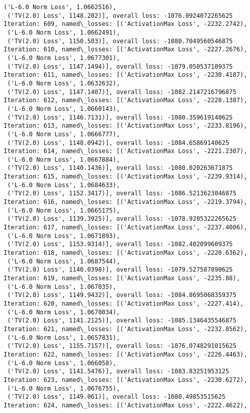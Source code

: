 \documentclass[10pt]{article}
\begin{document}
\begin{Verbatim}[commandchars=\\\{\}]
 ('L-6.0 Norm Loss', 1.0662516),
 ('TV(2.0) Loss', 1148.202)], overall loss: -1076.0924072265625
Iteration: 609, named\_losses: [('ActivationMax Loss', -2232.2742),
 ('L-6.0 Norm Loss', 1.0662491),
 ('TV(2.0) Loss', 1150.503)], overall loss: -1080.7049560546875
Iteration: 610, named\_losses: [('ActivationMax Loss', -2227.2676),
 ('L-6.0 Norm Loss', 1.0677301),
 ('TV(2.0) Loss', 1147.1494)], overall loss: -1079.050537109375
Iteration: 611, named\_losses: [('ActivationMax Loss', -2230.4187),
 ('L-6.0 Norm Loss', 1.0632632),
 ('TV(2.0) Loss', 1147.1407)], overall loss: -1082.2147216796875
Iteration: 612, named\_losses: [('ActivationMax Loss', -2228.1387),
 ('L-6.0 Norm Loss', 1.0660143),
 ('TV(2.0) Loss', 1146.7131)], overall loss: -1080.359619140625
Iteration: 613, named\_losses: [('ActivationMax Loss', -2233.8196),
 ('L-6.0 Norm Loss', 1.0666777),
 ('TV(2.0) Loss', 1148.0942)], overall loss: -1084.65869140625
Iteration: 614, named\_losses: [('ActivationMax Loss', -2221.2307),
 ('L-6.0 Norm Loss', 1.0667884),
 ('TV(2.0) Loss', 1140.1436)], overall loss: -1080.020263671875
Iteration: 615, named\_losses: [('ActivationMax Loss', -2239.9314),
 ('L-6.0 Norm Loss', 1.0684633),
 ('TV(2.0) Loss', 1152.3417)], overall loss: -1086.5213623046875
Iteration: 616, named\_losses: [('ActivationMax Loss', -2219.3794),
 ('L-6.0 Norm Loss', 1.0665175),
 ('TV(2.0) Loss', 1139.3925)], overall loss: -1078.9205322265625
Iteration: 617, named\_losses: [('ActivationMax Loss', -2237.4006),
 ('L-6.0 Norm Loss', 1.0671893),
 ('TV(2.0) Loss', 1153.9314)], overall loss: -1082.402099609375
Iteration: 618, named\_losses: [('ActivationMax Loss', -2220.6362),
 ('L-6.0 Norm Loss', 1.0687544),
 ('TV(2.0) Loss', 1140.0398)], overall loss: -1079.527587890625
Iteration: 619, named\_losses: [('ActivationMax Loss', -2235.88),
 ('L-6.0 Norm Loss', 1.067035),
 ('TV(2.0) Loss', 1149.9432)], overall loss: -1084.8695068359375
Iteration: 620, named\_losses: [('ActivationMax Loss', -2227.414),
 ('L-6.0 Norm Loss', 1.0670034),
 ('TV(2.0) Loss', 1141.2125)], overall loss: -1085.1346435546875
Iteration: 621, named\_losses: [('ActivationMax Loss', -2232.8562),
 ('L-6.0 Norm Loss', 1.0657831),
 ('TV(2.0) Loss', 1155.7157)], overall loss: -1076.0748291015625
Iteration: 622, named\_losses: [('ActivationMax Loss', -2226.4463),
 ('L-6.0 Norm Loss', 1.066058),
 ('TV(2.0) Loss', 1141.5476)], overall loss: -1083.83251953125
Iteration: 623, named\_losses: [('ActivationMax Loss', -2230.6272),
 ('L-6.0 Norm Loss', 1.0676755),
 ('TV(2.0) Loss', 1149.061)], overall loss: -1080.49853515625
Iteration: 624, named\_losses: [('ActivationMax Loss', -2222.4622),

\end{Verbatim}
\end{document}
